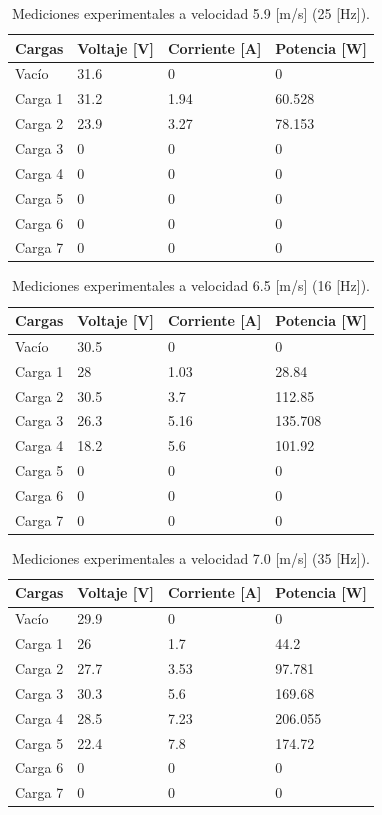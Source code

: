 \begin{table}[H]
\centering
\caption{Mediciones experimentales a velocidad 5.9 [m/s] (25 [Hz]).}
\begin{tabular}{|l|l|l|l|}
\hline
Cargas & Voltaje [V] & Corriente [A] & Potencia [W] \\ \hline
Vacío   & 31.6 & 0    & 0      \\
Carga 1 & 31.2 & 1.94 & 60.528 \\
Carga 2 & 23.9 & 3.27 & 78.153 \\
Carga 3 & 0    & 0    & 0      \\
Carga 4 & 0    & 0    & 0      \\
Carga 5 & 0    & 0    & 0      \\
Carga 6 & 0    & 0    & 0      \\
Carga 7 & 0    & 0    & 0      \\ \hline
\end{tabular}
\label{Table 2}
\end{table}

\begin{table}[H]
\centering
\caption{Mediciones experimentales a velocidad 6.5 [m/s] (16 [Hz]).}
\begin{tabular}{|l|l|l|l|}
\hline
Cargas & Voltaje [V] & Corriente [A] & Potencia [W] \\ \hline
Vacío  & 30.5 & 0    & 0       \\
Carga 1 & 28   & 1.03 & 28.84   \\
Carga 2 & 30.5 & 3.7  & 112.85  \\
Carga 3 & 26.3 & 5.16 & 135.708 \\
Carga 4 & 18.2 & 5.6  & 101.92  \\
Carga 5 & 0    & 0    & 0       \\
Carga 6 & 0    & 0    & 0       \\
Carga 7 & 0    & 0    & 0       \\ \hline
\end{tabular}
\label{Table 3}
\end{table}

\begin{table}[H]
\centering
\caption{Mediciones experimentales a velocidad 7.0 [m/s] (35 [Hz]).}
\begin{tabular}{|l|l|l|l|}
\hline
Cargas & Voltaje [V] & Corriente [A] & Potencia [W] \\ \hline
Vacío  & 29.9 & 0    & 0       \\
Carga 1 & 26   & 1.7  & 44.2    \\
Carga 2 & 27.7 & 3.53 & 97.781  \\
Carga 3 & 30.3 & 5.6  & 169.68  \\
Carga 4 & 28.5 & 7.23 & 206.055 \\
Carga 5 & 22.4 & 7.8  & 174.72  \\
Carga 6 & 0    & 0    & 0       \\
Carga 7 & 0    & 0    & 0       \\ \hline
\end{tabular}
\label{Table 4}
\end{table}

